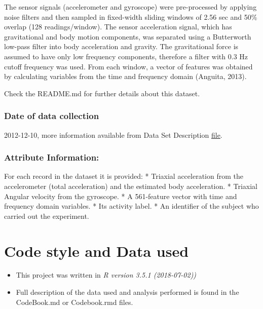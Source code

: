 \documentclass[]{article}
\providecommand{\tightlist}{%
  \setlength{\itemsep}{0pt}\setlength{\parskip}{0pt}}
\begin{document}
The sensor signals (accelerometer and gyroscope) were pre-processed by
applying noise filters and then sampled in fixed-width sliding windows
of 2.56 sec and 50\% overlap (128 readings/window). The sensor
acceleration signal, which has gravitational and body motion components,
was separated using a Butterworth low-pass filter into body acceleration
and gravity. The gravitational force is assumed to have only low
frequency components, therefore a filter with 0.3 Hz cutoff frequency
was used. From each window, a vector of features was obtained by
calculating variables from the time and frequency domain (Anguita,
2013).

Check the README.md for further details about this dataset.

\subsubsection{Date of data collection}\label{date-of-data-collection}

2012-12-10, more information available from Data Set Description
\href{http://archive.ics.uci.edu/ml/datasets/Human+Activity+Recognition+Using+Smartphones\#}{file}.

\subsubsection{Attribute Information:}\label{attribute-information}

For each record in the dataset it is provided: * Triaxial acceleration
from the accelerometer (total acceleration) and the estimated body
acceleration. * Triaxial Angular velocity from the gyroscope. * A
561-feature vector with time and frequency domain variables. * Its
activity label. * An identifier of the subject who carried out the
experiment.

\section{Code style and Data used}\label{code-style-and-data-used}

\begin{itemize}
\tightlist
\item
  This project was written in \emph{R version 3.5.1 (2018-07-02))}
\item
  Full description of the data used and analysis performed is found in
  the CodeBook.md or Codebook.rmd files.
\end{itemize}
\end{document}
